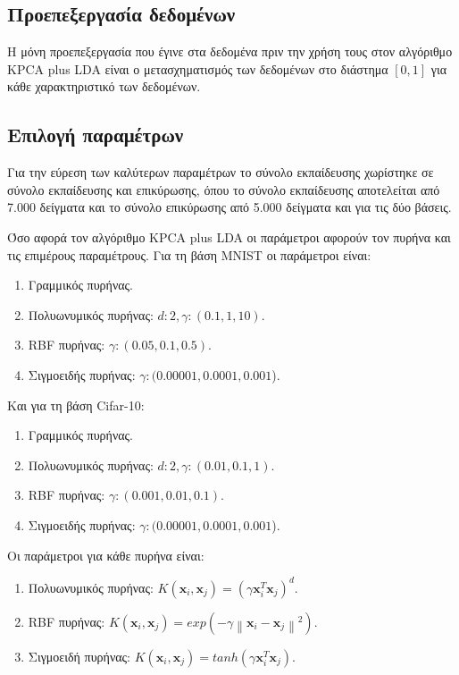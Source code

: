 \documentclass[a4paper]{article}
\newcommand{\norm}[1]{\left\lVert#1\right\rVert}
\begin{document}
\subsection{Προεπεξεργασία δεδομένων}

Η μόνη προεπεξεργασία που έγινε στα δεδομένα πριν την χρήση τους στον αλγόριθμο
KPCA plus LDA είναι ο μετασχηματισμός των δεδομένων στο διάστημα $[0,1]$ για
κάθε χαρακτηριστικό των δεδομένων.

\subsection{Επιλογή παραμέτρων}

Για την εύρεση των καλύτερων παραμέτρων το σύνολο εκπαίδευσης χωρίστηκε σε
σύνολο εκπαίδευσης και επικύρωσης, όπου το σύνολο εκπαίδευσης αποτελείται από
7.000 δείγματα και το σύνολο επικύρωσης από 5.000 δείγματα και για τις δύο
βάσεις.

Όσο αφορά τον αλγόριθμο KPCA plus LDA οι παράμετροι αφορούν τον πυρήνα και τις
επιμέρους παραμέτρους. Για τη βάση MNIST οι παράμετροι είναι:

\begin{enumerate}
    \item Γραμμικός πυρήνας.
    \item Πολυωνυμικός πυρήνας: $d: 2, \gamma: (0.1, 1, 10)$.
    \item RBF πυρήνας: $\gamma: (0.05, 0.1, 0.5)$.
    \item Σιγμοειδής πυρήνας: $\gamma: (0.00001, 0.0001, 0.001$).
\end{enumerate}

Και για τη βάση Cifar-10:

\begin{enumerate}
    \item Γραμμικός πυρήνας.
    \item Πολυωνυμικός πυρήνας: $d: 2, \gamma: (0.01, 0.1, 1)$.
    \item RBF πυρήνας: $\gamma: (0.001, 0.01, 0.1)$.
    \item Σιγμοειδής πυρήνας: $\gamma: (0.00001, 0.0001, 0.001$).
\end{enumerate}

Οι παράμετροι για κάθε πυρήνα είναι:

\begin{enumerate}
    \item Πολυωνυμικός πυρήνας: $K(\bm{x}_i,\bm{x}_j) = (\gamma \bm{x}_i^T
        \bm{x}_j)^d$.
    \item RBF πυρήνας: $K(\bm{x}_i,\bm{x}_j) = exp(-\gamma \norm{\bm{x}_i -
        \bm{x}_j}^2)$.
    \item Σιγμοειδή πυρήνας: $K(\bm{x}_i,\bm{x}_j) = tanh(\gamma \bm{x}_i^T
        \bm{x}_j)$.
\end{enumerate}
\end{document}
